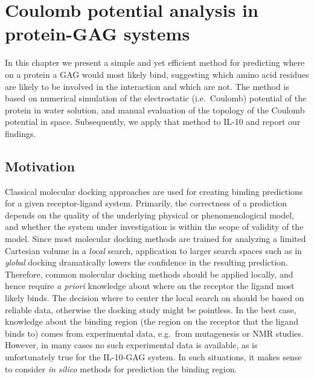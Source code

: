 \chapter{Coulomb potential analysis in protein-GAG systems}
\label{chapter:bspred}

In this chapter we present a simple and yet efficient method for predicting
where on a protein a GAG would most likely bind, suggesting which amino acid
residues are likely to be involved in the interaction and which are not. The
method is based on numerical simulation of the electrostatic (i.e.\ Coulomb)
potential of the protein in water solution, and manual evaluation of the
topology of the Coulomb potential in space. Subsequently, we apply that method
to IL-10 and report our findings.

\section{Motivation}
\label{bspred:motivation}

Classical molecular docking approaches are used for creating binding predictions
for a given receptor-ligand system. Primarily, the correctness of a prediction
depends on the quality of the underlying physical or phenomenological model, and
whether the system under investigation is within the scope of validity of the
model. Since most molecular docking methods are trained for analyzing a limited
Cartesian volume in a \textit{local} search, application to larger search spaces
such as in \textit{global} docking dramatically lowers the confidence in the
resulting prediction. Therefore, common molecular docking methods should be
applied locally, and hence require \textit{a priori} knowledge about where on
the receptor the ligand most likely binds. The decision where to center the
local search on should be based on reliable data, otherwise the docking study
might be pointless. In the best case, knowledge about the binding region (the
region on the receptor that the ligand binds to) comes from experimental data,
e.g.\ from mutagenesis or NMR studies. However, in many cases no such
experimental data is available, as is unfortunately true for the IL-10-GAG
system. In such situations, it makes sense to consider \textit{in silico}
methods for prediction the binding region.

